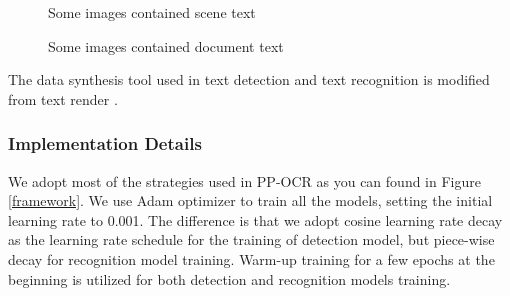 \documentclass[letterpaper]{article} %
\begin{document}
\begin{figure}[h!]
\centering
{}
\caption{Some images contained scene text}
\label{SRT}
\end{figure}

\begin{figure}[h!]
\centering
{}
\caption{Some images contained document text}
\label{doc}
\end{figure}

The data synthesis tool used in text detection and text recognition is modified from text render \cite{textrender}.
    
\subsubsection{Implementation Details}
We adopt most of the strategies used in PP-OCR \cite{du2020pp} as you can found in Figure \ref{framework}. We use Adam optimizer to train all the models, setting the initial learning rate to 0.001. The difference is that we adopt cosine learning rate decay as the learning rate schedule for the training of detection model, but piece-wise decay for recognition model training. Warm-up training for a few epochs at the beginning is utilized for both detection and recognition models training.
\end{document}
